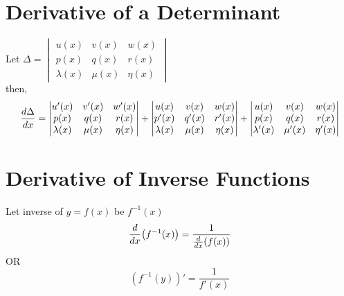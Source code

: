 \documentclass{article}
\begin{document}
\section{Derivative of a Determinant}
Let $\Delta=\begin{vmatrix}
    u(x)&v(x)&w(x)\\
    p(x)&q(x)&r(x)\\
    \lambda (x)&\mu(x)&\eta(x)
\end{vmatrix}$ \\ then, $$\dv{\Delta}{x}=\begin{vmatrix}
    u'(x)&v'(x)&w'(x)\\
    p(x)&q(x)&r(x)\\
    \lambda (x)&\mu(x)&\eta(x)
\end{vmatrix} + \begin{vmatrix}
    u(x)&v(x)&w(x)\\
    p'(x)&q'(x)&r'(x)\\
    \lambda (x)&\mu(x)&\eta(x)
\end{vmatrix}+\begin{vmatrix}
    u(x)&v(x)&w(x)\\
    p(x)&q(x)&r(x)\\
    \lambda' (x)&\mu'(x)&\eta'(x)
\end{vmatrix}$$

\section{Derivative of Inverse Functions}
Let inverse of $y=f(x)$ be $f^{-1}(x)$
$$\dv{x}(f^{-1}(x))=\frac{1}{\dv{x}(f(x))}$$
\hspace{6cm} OR
$$\left(f^{-1}(y)\right)'=\frac{1}{f'(x)}$$
\end{document}
